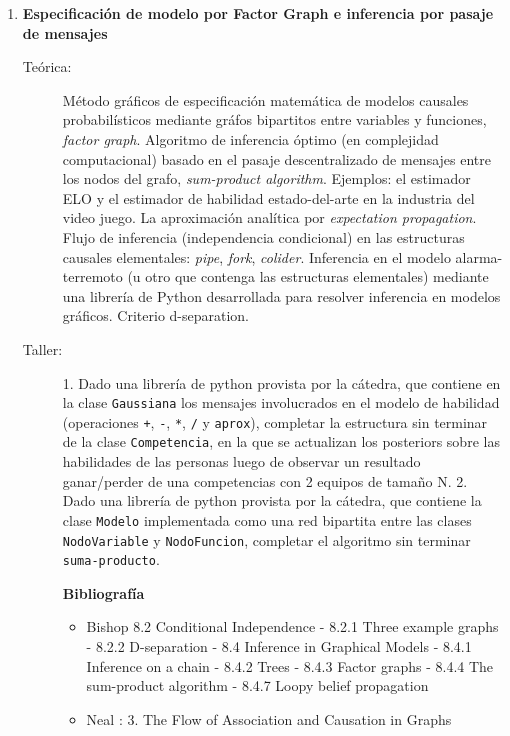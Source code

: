 \documentclass[11pt]{article}
\begin{document}
\begin{enumerate}
\item \textbf{Especificación de modelo por Factor Graph e inferencia por pasaje de mensajes}
\vspace{-0.15cm}
\begin{description}
\item[Teórica:]
Método gráficos de especificación matemática de modelos causales probabilísticos mediante gráfos bipartitos entre variables y funciones, \emph{factor graph}.
Algoritmo de inferencia óptimo (en complejidad computacional) basado en el pasaje descentralizado de mensajes entre los nodos del grafo, \emph{sum-product algorithm}.
Ejemplos: el estimador ELO y el estimador de habilidad estado-del-arte en la industria del video juego.
La aproximación analítica por \emph{expectation propagation}. Flujo de inferencia (independencia condicional) en las estructuras causales elementales: \emph{pipe}, \emph{fork}, \emph{colider}.
Inferencia en el modelo alarma-terremoto (u otro que contenga las estructuras elementales) mediante una librería de Python desarrollada para resolver inferencia en modelos gráficos.
Criterio d-separation.
\item[Taller:]
1. Dado una librería de python provista por la cátedra, que contiene en la clase \texttt{Gaussiana} los mensajes involucrados en el modelo de habilidad (operaciones \texttt{+}, \texttt{-}, \texttt{*}, \texttt{/} y  \texttt{aprox}), completar la estructura sin terminar de la clase \texttt{Competencia}, en la que se actualizan los posteriors sobre las habilidades de las personas luego de observar un resultado ganar/perder de una competencias con 2 equipos de tamaño N.
2. Dado una librería de python provista por la cátedra, que contiene la clase \texttt{Modelo} implementada como una red bipartita entre las clases \texttt{NodoVariable} y \texttt{NodoFuncion}, completar el algoritmo sin terminar \texttt{suma-producto}.
\item[] \textbf{Bibliografía}
\begin{itemize}
\item Bishop \cite{bishop2006-PRML} 8.2 Conditional Independence - 8.2.1 Three example graphs - 8.2.2 D-separation - 8.4 Inference in Graphical Models - 8.4.1 Inference on a chain - 8.4.2 Trees - 8.4.3 Factor graphs - 8.4.4 The sum-product algorithm - 8.4.7 Loopy belief propagation
\item Neal \cite{neal2020}: 3. The Flow of Association and
Causation in Graphs
\end{itemize}
\end{description}


\end{enumerate}
\end{document}
